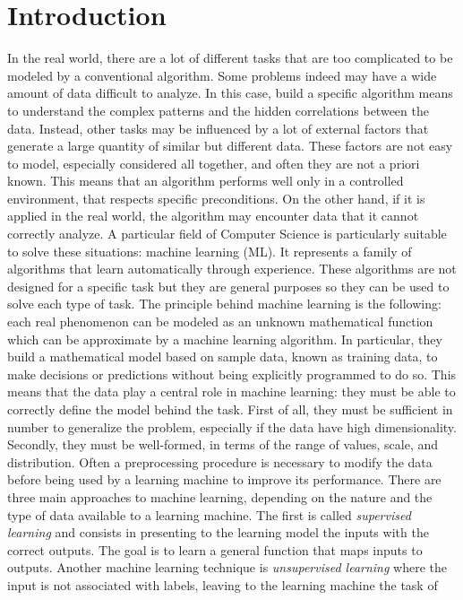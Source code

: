 \section{Introduction}
In the real world, there are a lot of different tasks that are too
complicated to be modeled by a conventional algorithm. Some problems
indeed may have a wide amount of data difficult to analyze. In this
case, build a specific algorithm means to understand the complex
patterns and the hidden correlations between the data. Instead, other
tasks may be influenced by a lot of external factors that generate a
large quantity of similar but different data. These factors are not easy
to model, especially considered all together, and often they are not a
priori known. This means that an algorithm performs well only in a
controlled environment, that respects specific preconditions. On the
other hand, if it is applied in the real world, the algorithm may
encounter data that it cannot correctly analyze. A particular field of
Computer Science is particularly suitable to solve these situations:
machine learning (ML). It represents a family of algorithms that learn
automatically through experience. These algorithms are not designed for
a specific task but they are general purposes so they can be used to
solve each type of task. The principle behind machine learning is the
following: each real phenomenon can be modeled as an unknown
mathematical function which can be approximate by a machine learning
algorithm. In particular, they build a mathematical model based on
sample data, known as training data, to make decisions or predictions
without being explicitly programmed to do so. This means that the data
play a central role in machine learning: they must be able to correctly
define the model behind the task. First of all, they must be sufficient
in number to generalize the problem, especially if the data have high
dimensionality. Secondly, they must be well-formed, in terms of the
range of values, scale, and distribution. Often a preprocessing
procedure is necessary to modify the data before being used by a
learning machine to improve its performance. There are three main
approaches to machine learning, depending on the nature and the type of
data available to a learning machine. The first is called
\emph{supervised learning} and consists in presenting to the learning
model the inputs with the correct outputs. The goal is to learn a
general function that maps inputs to outputs. Another machine learning
technique is \emph{unsupervised learning} where the input is not
associated with labels, leaving to the learning machine the task of
